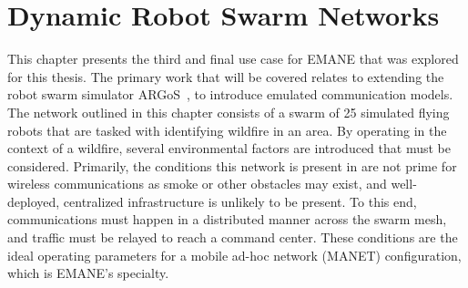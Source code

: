 \chapter{Dynamic Robot Swarm Networks}
\label{chapter5}
This chapter presents the third and final use case for EMANE that was explored for this thesis.
The primary work that will be covered relates to extending the robot swarm simulator ARGoS~\cite{argos}, to introduce emulated communication models.
The network outlined in this chapter consists of a swarm of 25 simulated flying robots that are tasked with identifying wildfire in an area.
By operating in the context of a wildfire, several environmental factors are introduced that must be considered.
Primarily, the conditions this network is present in are not prime for wireless communications as smoke or other obstacles may exist, and well-deployed, centralized infrastructure is unlikely to be present.
To this end, communications must happen in a distributed manner across the swarm mesh, and traffic must be relayed to reach a command center.
These conditions are the ideal operating parameters for a mobile ad-hoc network (MANET) configuration, which is EMANE's specialty.

